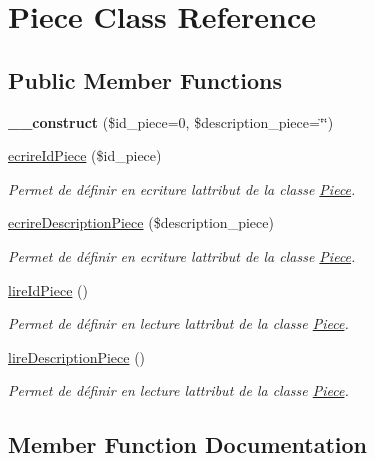 \hypertarget{class_piece}{}\section{Piece Class Reference}
\label{class_piece}
\subsection*{Public Member Functions}
\begin{DoxyCompactItemize}
\item 
\mbox{\label{class_piece_ad8aa13d96ed25fa82ce6665c0ff35799}} 
{\bfseries \+\_\+\+\_\+construct} (\$id\+\_\+piece=0, \$description\+\_\+piece=\char`\"{}\char`\"{})
\item 
\hyperlink{class_piece_a6ad3e247640cd544ae853dfd19b7c42c}{ecrire\+Id\+Piece} (\$id\+\_\+piece)
\begin{DoxyCompactList}\small\item\em Permet de définir en ecriture l\textquotesingle{}attribut de la classe \hyperlink{class_piece}{Piece}. \end{DoxyCompactList}\item 
\hyperlink{class_piece_aba1f58a896a2a33c9b8ae9b705b53069}{ecrire\+Description\+Piece} (\$description\+\_\+piece)
\begin{DoxyCompactList}\small\item\em Permet de définir en ecriture l\textquotesingle{}attribut de la classe \hyperlink{class_piece}{Piece}. \end{DoxyCompactList}\item 
\hyperlink{class_piece_a2dd6d8c0b86b173535d40603da175418}{lire\+Id\+Piece} ()
\begin{DoxyCompactList}\small\item\em Permet de définir en lecture l\textquotesingle{}attribut de la classe \hyperlink{class_piece}{Piece}. \end{DoxyCompactList}\item 
\hyperlink{class_piece_aeccf1ee3ec25e01d6f7ce7068f8397b4}{lire\+Description\+Piece} ()
\begin{DoxyCompactList}\small\item\em Permet de définir en lecture l\textquotesingle{}attribut de la classe \hyperlink{class_piece}{Piece}. \end{DoxyCompactList}\end{DoxyCompactItemize}


\subsection{Member Function Documentation}
\mbox{\label{class_piece_aba1f58a896a2a33c9b8ae9b705b53069}} 
